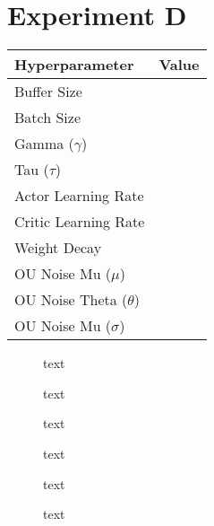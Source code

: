 \section{Experiment D}

\begin{minipage}{0.45\textwidth}
	\centering
	\begin{tabular}{lr}
	\toprule
	\textbf{Hyperparameter} & \textbf{Value} \\
	\midrule
	Buffer Size & \\
	Batch Size & \\
	Gamma ($\gamma$) & \\
	Tau ($\tau$) & \\
	Actor Learning Rate & \\
	Critic Learning Rate & \\
	Weight Decay & \\
	OU Noise Mu ($\mu$) & \\
	OU Noise Theta ($\theta$) & \\
	OU Noise Mu ($\sigma$) & \\
	\bottomrule
	\end{tabular}
\end{minipage}
\hspace{1cm}
\begin{minipage}{0.45\textwidth}
	\centering
\end{minipage}

\begin{figure}[h]
	\begin{minipage}{0.45\textwidth}
		\centering
		
		\caption{text}
		\label{fig:5401_raw_reward}
	\end{minipage}
	\hspace{0.75cm}
	\begin{minipage}{0.45\textwidth}
		\centering
		
		\caption{text}
		\label{fig:5402_average_reward}
	\end{minipage}
\end{figure}

\begin{figure}[h]
	\begin{minipage}{0.45\textwidth}
		\centering
		\caption{text}
		\label{key}
	\end{minipage}
	\hspace{1cm}
	\begin{minipage}{0.45\textwidth}
		\centering
		\caption{text}
		\label{key}
	\end{minipage}
\end{figure}

\begin{figure}[h]
	\begin{minipage}{0.45\textwidth}
		\centering
		\caption{text}
		\label{key}
	\end{minipage}
	\hspace{1cm}
	\begin{minipage}{0.45\textwidth}
		\centering
		\caption{text}
		\label{key}
	\end{minipage}
\end{figure}
